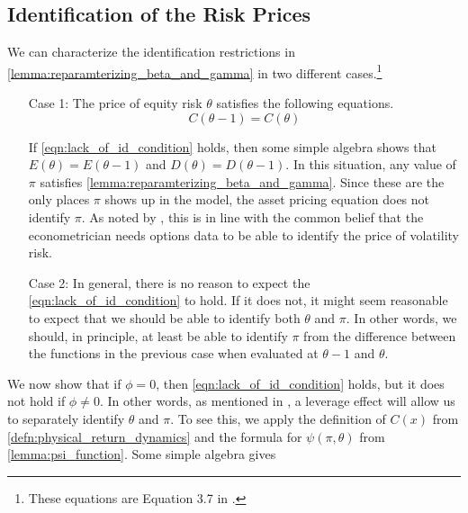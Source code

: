 \documentclass[11pt, letterpaper, twoside, final]{article}
\begin{document}
\subsection{Identification of the Risk Prices}

We can characterize the identification restrictions in \cref{lemma:reparamterizing_beta_and_gamma} in two
different cases.\footnote{These equations are Equation 3.7 in
\textcite{khrapov2016affine}.}

\begin{enumerate}
    \item[Case 1:] The price of equity risk $\theta$ satisfies the following equations. 
        \begin{equation}
            C(\theta - 1) = C(\theta) 
            \label{eqn:lack_of_id_condition}
        \end{equation}

        If \cref{eqn:lack_of_id_condition} holds, then some simple algebra shows that $E(\theta) = E(\theta-1)$
        and $D(\theta) = D(\theta-1)$.
        In this situation, any value of $\pi$ satisfies \cref{lemma:reparamterizing_beta_and_gamma}. 
        Since these are the only places $\pi$ shows up in the model, the asset pricing equation does not identify
        $\pi$. 
        As noted by \textcite{khrapov2016affine}, this is in line with the common belief that the econometrician
        needs options data to be able to identify the price of volatility risk. 

    \item[Case 2:] 
        In general, there is no reason to expect the \cref{eqn:lack_of_id_condition} to hold.
        If it does not, it might seem reasonable to expect that we should be able to identify both $\theta$ and
        $\pi$.
        In other words, we should, in principle, at least be able to identify $\pi$ from the difference between the
        functions in the previous case when evaluated at $\theta-1$ and $\theta$.
\end{enumerate}

We now show that if $\phi = 0$, then \cref{eqn:lack_of_id_condition} holds, but it does not hold if $\phi \neq 0$.
In other words, as mentioned in \textcite[13]{khrapov2016affine}, a leverage effect will allow us to separately
identify $\theta$ and $\pi$.
To see this, we apply the definition of $C(x)$ from \cref{defn:physical_return_dynamics} and the formula for
$\psi(\pi, \theta)$ from \cref{lemma:psi_function}.
Some simple algebra gives 
\end{document}
